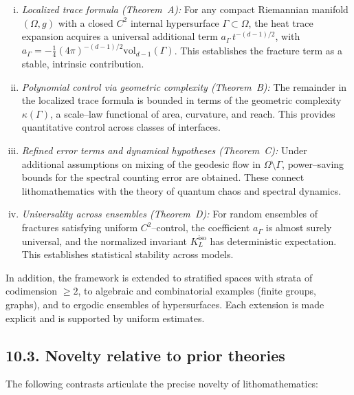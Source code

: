 \begin{enumerate}[(i)]
\item \emph{Localized trace formula (Theorem~A):}  
For any compact Riemannian manifold $(\Omega,g)$ with a closed $C^2$ internal hypersurface $\Gamma\subset \Omega$, the heat trace expansion acquires a universal additional term $a_\Gamma\,t^{-(d-1)/2}$, with $a_\Gamma=-\tfrac14(4\pi)^{-(d-1)/2}\mathrm{vol}_{d-1}(\Gamma)$. This establishes the fracture term as a stable, intrinsic contribution.

\item \emph{Polynomial control via geometric complexity (Theorem~B):}  
The remainder in the localized trace formula is bounded in terms of the geometric complexity $\kappa(\Gamma)$, a scale–law functional of area, curvature, and reach. This provides quantitative control across classes of interfaces.

\item \emph{Refined error terms and dynamical hypotheses (Theorem~C):}  
Under additional assumptions on mixing of the geodesic flow in $\Omega\setminus \Gamma$, power–saving bounds for the spectral counting error are obtained. These connect lithomathematics with the theory of quantum chaos and spectral dynamics.

\item \emph{Universality across ensembles (Theorem~D):}  
For random ensembles of fractures satisfying uniform $C^2$–control, the coefficient $a_\Gamma$ is almost surely universal, and the normalized invariant $K_L^{\mathrm{iso}}$ has deterministic expectation. This establishes statistical stability across models.
\end{enumerate}

In addition, the framework is extended to stratified spaces with strata of codimension $\geq 2$, to algebraic and combinatorial examples (finite groups, graphs), and to ergodic ensembles of hypersurfaces. Each extension is made explicit and is supported by uniform estimates.

\subsection*{10.3. Novelty relative to prior theories}
The following contrasts articulate the precise novelty of lithomathematics:

